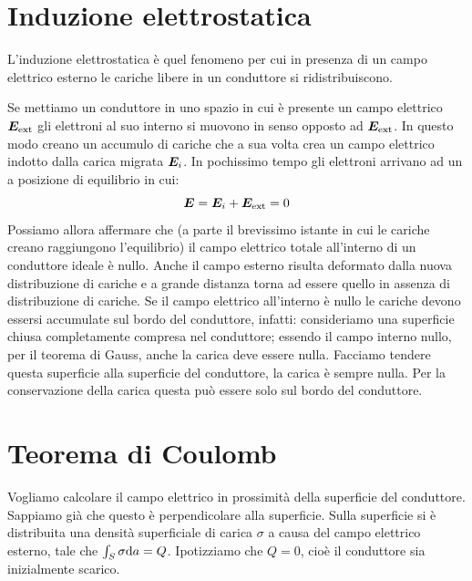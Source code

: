 \section{Induzione elettrostatica}
\begin{Def}
L'induzione elettrostatica è quel fenomeno per cui in presenza di un campo elettrico esterno le cariche libere in un conduttore si ridistribuiscono.
\end{Def}
Se mettiamo un conduttore in uno spazio in cui è presente un campo elettrico $\boldsymbol{E}_\text{ext}$ gli elettroni al suo interno si muovono in senso opposto ad $\boldsymbol{E}_\text{ext}$. In questo modo creano un accumulo di cariche che a sua volta crea un campo elettrico indotto dalla carica migrata $\boldsymbol{E}_i$. In pochissimo tempo gli elettroni arrivano ad un a posizione di equilibrio in cui:
\begin{equation*}\boldsymbol{E}=\boldsymbol{E}_i+\boldsymbol{E}_\text{ext}=0\end{equation*}
Possiamo allora affermare che (a parte il brevissimo istante in cui le cariche creano raggiungono l'equilibrio) il campo elettrico totale all'interno di un conduttore ideale è nullo. Anche il campo esterno risulta deformato dalla nuova distribuzione di cariche e a grande distanza torna ad essere quello in assenza di distribuzione di cariche. Se il campo elettrico all'interno è nullo le cariche devono essersi accumulate sul bordo del conduttore, infatti:
consideriamo una superficie chiusa completamente compresa nel conduttore; essendo il campo interno nullo, per il teorema di Gauss, anche la carica deve essere nulla. Facciamo tendere questa superficie alla superficie del conduttore, la carica è sempre nulla. Per la conservazione della carica questa può essere solo sul bordo del conduttore.

\section{Teorema di Coulomb}
Vogliamo calcolare il campo elettrico in prossimità della superficie del conduttore. Sappiamo già che questo è perpendicolare alla superficie. Sulla superficie si è distribuita una densità superficiale di carica $\sigma$ a causa del campo elettrico esterno, tale che $\int_S \sigma\mathrm{d} a=Q$. Ipotizziamo che $Q=0$, cioè il conduttore sia inizialmente scarico.

